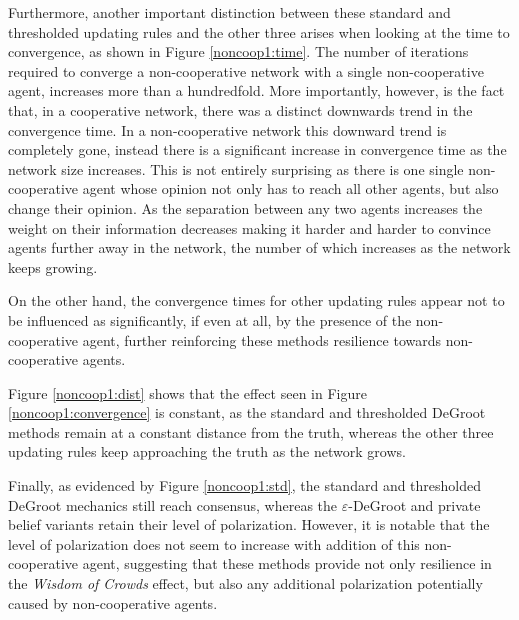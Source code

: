 \documentclass[a4paper, 12pt]{report}
\begin{document}
\noindent Furthermore, another important distinction between these standard and thresholded updating rules and the other three arises when looking at the time to convergence, as shown in Figure \ref{noncoop1:time}. The number of iterations required to converge a non-cooperative network with a single non-cooperative agent, increases more than a hundredfold. More importantly, however, is the fact that, in a cooperative network, there was a distinct downwards trend in the convergence time. In a non-cooperative network this downward trend is completely gone, instead there is a significant increase in convergence time as the network size increases. This is not entirely surprising as there is one single non-cooperative agent whose opinion not only has to reach all other agents, but also change their opinion. As the separation between any two agents increases the weight on their information decreases making it harder and harder to convince agents further away in the network, the number of which increases as the network keeps growing.

\noindent On the other hand, the convergence times for other updating rules appear not to be influenced as significantly, if even at all, by the presence of the non-cooperative agent, further reinforcing these methods resilience towards non-cooperative agents.

\noindent Figure \ref{noncoop1:dist} shows that the effect seen in Figure \ref{noncoop1:convergence} is constant, as the standard and thresholded DeGroot methods remain at a constant distance from the truth, whereas the other three updating rules keep approaching the truth as the network grows.

\noindent Finally, as evidenced by Figure \ref{noncoop1:std}, the standard and thresholded DeGroot mechanics still reach consensus, whereas the $\varepsilon$-DeGroot and private belief variants retain their level of polarization. However, it is notable that the level of polarization does not seem to increase with addition of this non-cooperative agent, suggesting that these methods provide not only resilience in the \emph{Wisdom of Crowds} effect, but also any additional polarization potentially caused by non-cooperative agents.
\end{document}
